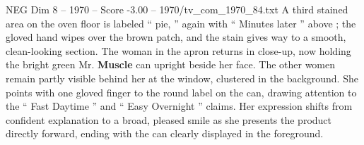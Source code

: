 \begin{textsample}{NEG Dim 8 – 1970 – Score -3.00 – 1970/tv\_com\_1970\_84.txt}
A third stained area on the oven floor is labeled “ pie, ” again with “ Minutes later ” above ; the gloved hand wipes over the brown patch, and the stain gives way to a smooth, clean-looking section.
The woman in the apron returns in close-up, now holding the bright green Mr. \textbf{Muscle} can upright beside her face.
The other women remain partly visible behind her at the window, clustered in the background.
She points with one gloved finger to the round label on the can, drawing attention to the “ Fast Daytime ” and “ Easy Overnight ” claims.
Her expression shifts from confident explanation to a broad, pleased smile as she presents the product directly forward, ending with the can clearly displayed in the foreground.

\end{textsample}
